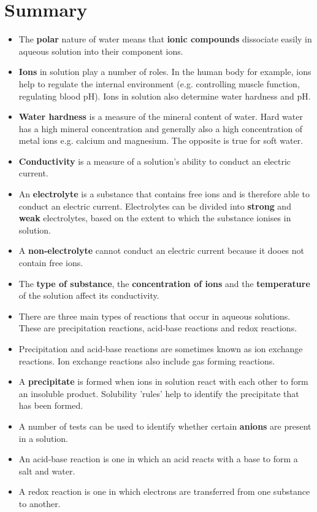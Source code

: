             \section{Summary}
            \nopagebreak
            \label{m38719*eip-903}\begin{itemize}[noitemsep]
            \label{m38719*uid95}\item The \textbf{polar} nature of water means that \textbf{ionic compounds} dissociate easily in aqueous solution into their component ions.
\label{m38719*uid96}\item \textbf{Ions} in solution play a number of roles. In the human body for example, ions help to regulate the internal environment (e.g. controlling muscle function, regulating blood pH). Ions in solution also determine water hardness and pH.
\label{m38719*uid97}\item \textbf{Water hardness} is a measure of the mineral content of water. Hard water has a high mineral concentration and generally also a high concentration of metal ions e.g. calcium and magnesium. The opposite is true for soft water.
\label{m38719*uid100}\item \textbf{Conductivity} is a measure of a solution's ability to conduct an electric current.
\label{m38719*uid101}\item An \textbf{electrolyte} is a substance that contains free ions and is therefore able to conduct an electric current. Electrolytes can be divided into \textbf{strong} and \textbf{weak} electrolytes, based on the extent to which the substance ionises in solution.
\label{m38719*uid102}\item A \textbf{non-electrolyte} cannot conduct an electric current because it dooes not contain free ions.
\label{m38719*uid103}\item The \textbf{type of substance}, the \textbf{concentration of ions} and the \textbf{temperature} of the solution affect its conductivity.
\label{m38719*uid0253}\item There are three main types of reactions that occur in aqueous solutions. These are precipitation reactions, acid-base reactions and redox reactions.
\label{m38719*uid8923}\item 
Precipitation and acid-base reactions are sometimes known as ion exchange reactions. Ion exchange reactions also include gas forming reactions.
\label{m38719*uid104}\item A \textbf{precipitate} is formed when ions in solution react with each other to form an insoluble product. Solubility 'rules' help to identify the precipitate that has been formed.
\label{m38719*uid105}\item A number of tests can be used to identify whether certain \textbf{anions} are present in a solution.
\label{m38719*id813}\item An acid-base reaction is one in which an acid reacts with a base to form a salt and water.
\label{m38719*uid823}\item A redox reaction is one in which electrons are transferred from one substance to another. 
\end{itemize}
